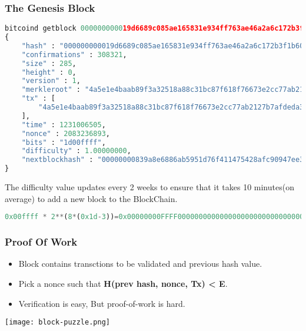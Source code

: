 \begin{frame}[fragile]
    \frametitle{The Genesis Block}
    \begin{lstlisting}[language=Python]
bitcoind getblock 000000000019d6689c085ae165831e934ff763ae46a2a6c172b3f1b60a8ce26f
{
    "hash" : "000000000019d6689c085ae165831e934ff763ae46a2a6c172b3f1b60a8ce26f",
    "confirmations" : 308321,
    "size" : 285,
    "height" : 0,
    "version" : 1,
    "merkleroot" : "4a5e1e4baab89f3a32518a88c31bc87f618f76673e2cc77ab2127b7afdeda33b",
    "tx" : [
        "4a5e1e4baab89f3a32518a88c31bc87f618f76673e2cc77ab2127b7afdeda33b"
    ],
    "time" : 1231006505,
    "nonce" : 2083236893,
    "bits" : "1d00ffff",
    "difficulty" : 1.00000000,
    "nextblockhash" : "00000000839a8e6886ab5951d76f411475428afc90947ee320161bbf18eb6048"
}
    \end{lstlisting}
    The difficulty value updates every 2 weeks to ensure that it takes 10 minutes(on average) to add a new block to the BlockChain.
    \begin{lstlisting}[language=Python]
0x00ffff * 2**(8*(0x1d-3))=0x00000000FFFF0000000000000000000000000000000000000000000000000000 \end{lstlisting}
\end{frame}

\begin{frame}[fragile]
    \frametitle{Proof Of Work}
    \begin{itemize}
        \item Block contains transctions to be validated and previous hash value.
        \item Pick a nonce such that \textbf{H(prev hash, nonce, Tx) < E}.
        \item Verification is easy, But proof-of-work is hard.
    \end{itemize}
    \texttt{[image: block-puzzle.png]}
\end{frame}

